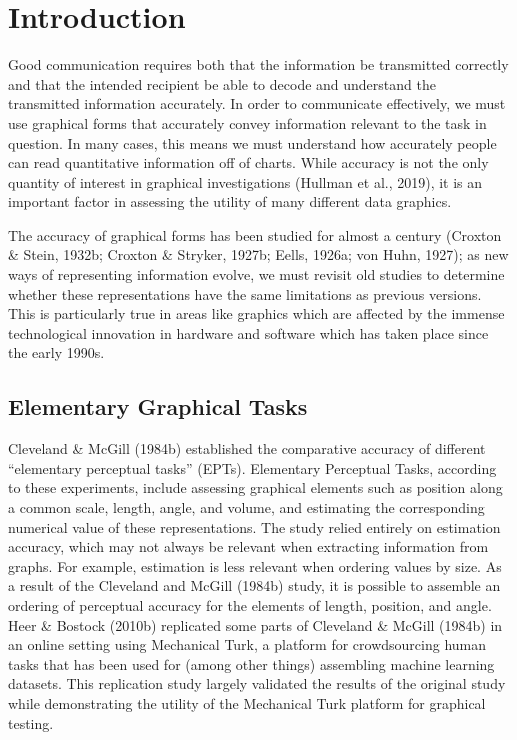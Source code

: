 \documentclass[phd]{nuthesis}
\begin{document}
\section{Introduction}\label{introduction}

Good communication requires both that the information be transmitted
correctly and that the intended recipient be able to decode and
understand the transmitted information accurately. In order to
communicate effectively, we must use graphical forms that accurately
convey information relevant to the task in question. In many cases, this
means we must understand how accurately people can read quantitative
information off of charts. While accuracy is not the only quantity of
interest in graphical investigations (Hullman et al., 2019), it is an
important factor in assessing the utility of many different data
graphics.

The accuracy of graphical forms has been studied for almost a century
(Croxton \& Stein, 1932b; Croxton \& Stryker, 1927b; Eells, 1926a; von
Huhn, 1927); as new ways of representing information evolve, we must
revisit old studies to determine whether these representations have the
same limitations as previous versions. This is particularly true in
areas like graphics which are affected by the immense technological
innovation in hardware and software which has taken place since the
early 1990s.

\subsection{Elementary Graphical
Tasks}\label{elementary-graphical-tasks}

Cleveland \& McGill (1984b) established the comparative accuracy of
different ``elementary perceptual tasks'' (EPTs). Elementary Perceptual
Tasks, according to these experiments, include assessing graphical
elements such as position along a common scale, length, angle, and
volume, and estimating the corresponding numerical value of these
representations. The study relied entirely on estimation accuracy, which
may not always be relevant when extracting information from graphs. For
example, estimation is less relevant when ordering values by size. As a
result of the Cleveland and McGill (1984b) study, it is possible to
assemble an ordering of perceptual accuracy for the elements of length,
position, and angle. Heer \& Bostock (2010b) replicated some parts of
Cleveland \& McGill (1984b) in an online setting using Mechanical Turk,
a platform for crowdsourcing human tasks that has been used for (among
other things) assembling machine learning datasets. This replication
study largely validated the results of the original study while
demonstrating the utility of the Mechanical Turk platform for graphical
testing.
\end{document}

